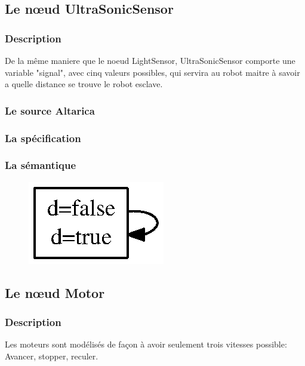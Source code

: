   \subsection{Le n\oe{}ud UltraSonicSensor}
  
   \subsubsection{Description}
   De la même maniere que le noeud LightSensor, UltraSonicSensor
   comporte une variable "signal", avec cinq valeurs possibles, qui
   servira au robot maitre à savoir a quelle distance se trouve le robot
   esclave.

   \subsubsection{Le source Altarica}
   
   
   \subsubsection{La spécification}
   
   
   \subsubsection{La sémantique}
   \begin{figure}[!ht]
    \begin{center}
     \includegraphics{../src/altarica/UltraSonicSensor.eps}
    \end{center}
   \end{figure}

  \subsection{Le n\oe{}ud Motor}
  
   \subsubsection{Description}
   Les moteurs sont modélisés de façon à avoir seulement trois vitesses
   possible: Avancer, stopper, reculer.

